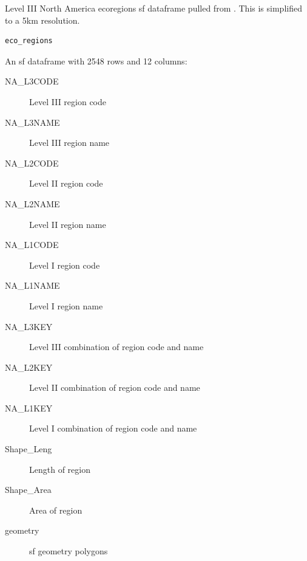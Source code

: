 %
\begin{Description}
Level III North America ecoregions sf dataframe pulled from
. This
is simplified to a 5km resolution.
\end{Description}
%
\begin{Usage}
\begin{verbatim}
eco_regions
\end{verbatim}
\end{Usage}
%
\begin{Format}
%
\begin{SubSection}{}

An sf dataframe with 2548 rows and 12 columns:
\begin{description}

\item[NA\_L3CODE] Level III region code
\item[NA\_L3NAME] Level III region name
\item[NA\_L2CODE] Level II region code
\item[NA\_L2NAME] Level II region name
\item[NA\_L1CODE] Level I region code
\item[NA\_L1NAME] Level I region name
\item[NA\_L3KEY] Level III combination of region code and name
\item[NA\_L2KEY] Level II combination of region code and name
\item[NA\_L1KEY] Level I combination of region code and name
\item[Shape\_Leng] Length of region
\item[Shape\_Area] Area of region
\item[geometry] sf geometry polygons

\end{description}

\end{SubSection}

\end{Format}
